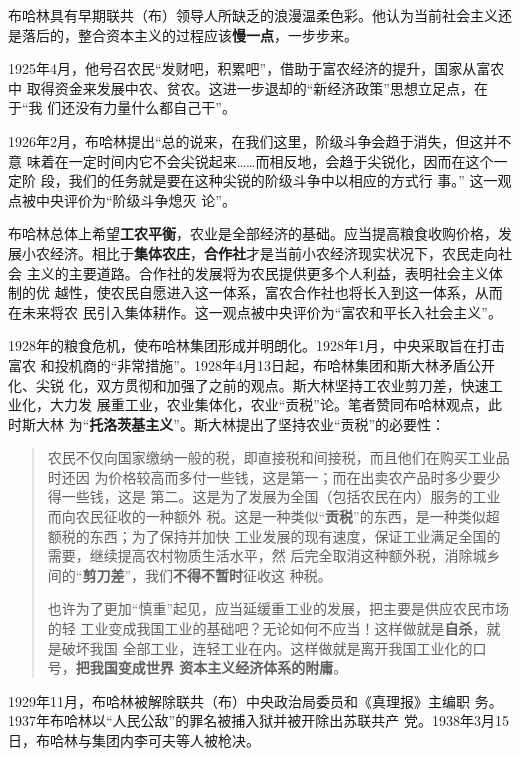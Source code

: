 \begin{enumerate}
  布哈林具有早期联共（布）领导人所缺乏的浪漫温柔色彩。他认为当前社会主义还
  是落后的，整合资本主义的过程应该\textbf{慢一点}，一步步来。

  1925年4月，他号召农民“发财吧，积累吧”，借助于富农经济的提升，国家从富农中
  取得资金来发展中农、贫农。这进一步退却的“新经济政策”思想立足点，在于“我
  们还没有力量什么都自己干”。

  1926年2月，布哈林提出“总的说来，在我们这里，阶级斗争会趋于消失，但这并不意
  味着在一定时间内它不会尖锐起来……而相反地，会趋于尖锐化，因而在这个一定阶
  段，我们的任务就是要在这种尖锐的阶级斗争中以相应的方式行
  事。” 这一观点被中央评价为“阶级斗争熄灭
  论”。

  布哈林总体上希望\textbf{工农平衡}，农业是全部经济的基础。应当提高粮食收购价格，发
  展小农经济。相比于\textbf{集体农庄}，\textbf{合作社}才是当前小农经济现实状况下，农民走向社会
  主义的主要道路。合作社的发展将为农民提供更多个人利益，表明社会主义体制的优
  越性，使农民自愿进入这一体系，富农合作社也将长入到这一体系，从而在未来将农
  民引入集体耕作。这一观点被中央评价为“富农和平长入社会主义”。

  1928年的粮食危机，使布哈林集团形成并明朗化。1928年1月，中央采取旨在打击富农
  和投机商的“非常措施”。1928年4月13日起，布哈林集团和斯大林矛盾公开化、尖锐
  化，双方贯彻和加强了之前的观点。斯大林坚持工农业剪刀差，快速工业化，大力发
  展重工业，农业集体化，农业“贡税”论。笔者赞同布哈林观点，此时斯大林
  为“\textbf{托洛茨基主义}”。斯大林提出了坚持农业“贡税”的必要性：
  \begin{quotation}
    农民不仅向国家缴纳一般的税，即直接税和间接税，而且他们在购买工业品时还因
    为价格较高而多付一些钱，这是第一；而在出卖农产品时多少要少得一些钱，这是
    第二。这是为了发展为全国（包括农民在内）服务的工业而向农民征收的一种额外
    税。这是一种类似“\textbf{贡税}”的东西，是一种类似超额税的东西；为了保持并加快
    工业发展的现有速度，保证工业满足全国的需要，继续提高农村物质生活水平，然
    后完全取消这种额外税，消除城乡间的“\textbf{剪刀差}”，我们\textbf{不得不暂时}征收这
    种税。

    也许为了更加“慎重”起见，应当延缓重工业的发展，把主要是供应农民市场的轻
    工业变成我国工业的基础吧？无论如何不应当！这样做就是\textbf{自杀}，就是破坏我国
    全部工业，连轻工业在内。这样做就是离开我国工业化的口号，\textbf{把我国变成世界
      资本主义经济体系的附庸}。
  \end{quotation}

  1929年11月，布哈林被解除联共（布）中央政治局委员和《真理报》主编职
  务。1937年布哈林以“人民公敌”的罪名被捕入狱并被开除出苏联共产
  党。1938年3月15日，布哈林与集团内李可夫等人被枪决。

\end{enumerate}


